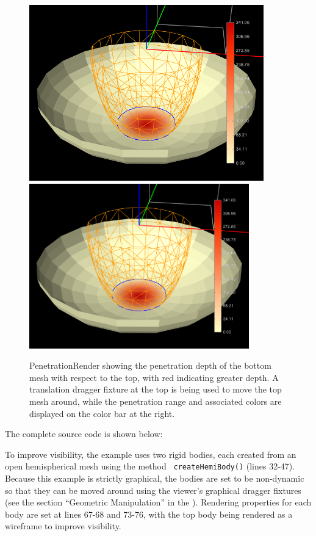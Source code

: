 \begin{figure}[ht]
\begin{center}
\iflatexml
 \includegraphics[]{images/PenetrationRender}
\else
 \includegraphics[width=3.75in]{images/PenetrationRender}
\fi
\end{center}
\caption{PenetrationRender showing the penetration depth of the bottom
mesh with respect to the top, with red indicating greater depth.
A translation dragger fixture at the top is being used to 
move the top mesh around, while the penetration range and
associated colors are displayed on the color bar at the right.}
\label{PenetrationRender:fig}
\end{figure}

The complete source code is shown below:
%
\lstset{numbers=left}

\lstset{numbers=none} 

To improve visibility, the example uses two rigid bodies, each created
from an open hemispherical mesh using the method {\tt
createHemiBody()} (lines 32-47). Because this example is strictly
graphical, the bodies are set to be non-dynamic so that they can be
moved around using the viewer's graphical dragger fixtures (see the
section ``Geometric Manipulation'' in the
). 
Rendering properties for each body are set at lines
67-68 and 73-76, with the top body being rendered as a wireframe to
improve visibility.

